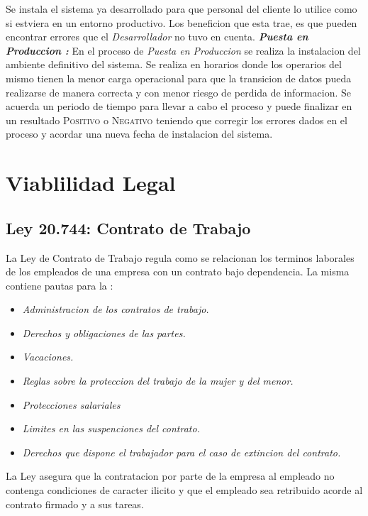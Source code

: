\documentclass[
10pt, %
a4paper, %
oneside, %
headinclude,footinclude, %
BCOR5mm, %
]{scrartcl}
\begin{document}
\begin{flushleft}
  Se instala el sistema ya desarrollado para que personal del cliente lo
  utilice como si estviera en un entorno productivo. Los beneficion que esta
  trae, es que pueden encontrar errores que el \textit{Desarrollador} no tuvo
  en cuenta.
  \newline  \newline
  \textbf{ \emph{Puesta en Produccion : } } En el proceso de
  \textit{Puesta en Produccion} se realiza la instalacion del ambiente
  definitivo del sistema. Se realiza en horarios donde los operarios del mismo
  tienen la menor carga operacional para que la transicion de datos pueda
  realizarse de manera correcta y con menor riesgo de perdida de informacion.
  Se acuerda un periodo de tiempo para llevar a cabo el proceso y puede
  finalizar en un resultado \textsc{Positivo} o \textsc{Negativo} teniendo
  que corregir los errores dados en el proceso y acordar una nueva fecha de
  instalacion del sistema.
  \end{flushleft}


\section{Viablilidad Legal}
  \subsection{Ley 20.744: Contrato de Trabajo}
  \begin{flushleft}
  La Ley de Contrato de Trabajo regula como se relacionan los terminos laborales
  de los empleados de una empresa con un contrato bajo dependencia.
  La misma contiene pautas para la :
  \begin{itemize}
    \item \emph{Administracion de los contratos de trabajo.}
    \item \emph{Derechos y obligaciones de las partes.}
    \item \emph{Vacaciones.}
    \item \emph{Reglas sobre la proteccion del trabajo de la mujer y del menor.}
    \item \emph{Protecciones salariales}
    \item \emph{Limites en las suspenciones del contrato.}
    \item \emph{Derechos que dispone el trabajador para el caso de extincion
                del contrato.}
  \end{itemize}
  La Ley asegura que la contratacion por parte de la empresa al empleado
  no contenga condiciones de caracter ilicito y que el empleado sea
  retribuido acorde al contrato firmado y a sus tareas.
  \end{flushleft}
\end{document}
